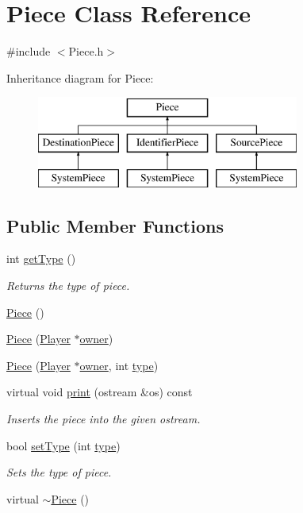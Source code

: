 \hypertarget{classPiece}{\section{Piece Class Reference}
\label{classPiece}
}


{\ttfamily \#include $<$Piece.\-h$>$}

Inheritance diagram for Piece\-:\begin{figure}[H]
\begin{center}
\leavevmode
\includegraphics[height=3.000000cm]{classPiece}
\end{center}
\end{figure}
\subsection*{Public Member Functions}
\begin{DoxyCompactItemize}
\item 
int \hyperlink{classPiece_aeebab4a49f40fde49a9698c19f51f4a0}{get\-Type} ()
\begin{DoxyCompactList}\small\item\em Returns the type of piece. \end{DoxyCompactList}\item 
\hyperlink{classPiece_ac57de5803bbad829b143bc7268267dc1}{Piece} ()
\item 
\hyperlink{classPiece_a645709ec114f364073ee432d102b0551}{Piece} (\hyperlink{classPlayer}{Player} $\ast$\hyperlink{classPiece_a43beac3b5268343b9f7e575d637eda98}{owner})
\item 
\hyperlink{classPiece_a72c6f3a5df2036c7743bd91e2daeb5bc}{Piece} (\hyperlink{classPlayer}{Player} $\ast$\hyperlink{classPiece_a43beac3b5268343b9f7e575d637eda98}{owner}, int \hyperlink{classPiece_a5c3c79a15de7daa1efde1b8aa246e8d4}{type})
\item 
virtual void \hyperlink{classPiece_aace14e1a78a22394f997b045fe31e84a}{print} (ostream \&os) const 
\begin{DoxyCompactList}\small\item\em Inserts the piece into the given ostream. \end{DoxyCompactList}\item 
bool \hyperlink{classPiece_acdc19e123cac0d8999ce70953de61aa3}{set\-Type} (int \hyperlink{classPiece_a5c3c79a15de7daa1efde1b8aa246e8d4}{type})
\begin{DoxyCompactList}\small\item\em Sets the type of piece. \end{DoxyCompactList}\item 
virtual \hyperlink{classPiece_a5d7a4f6bade94cb33b6f634de8aa7918}{$\sim$\-Piece} ()
\end{DoxyCompactItemize}
